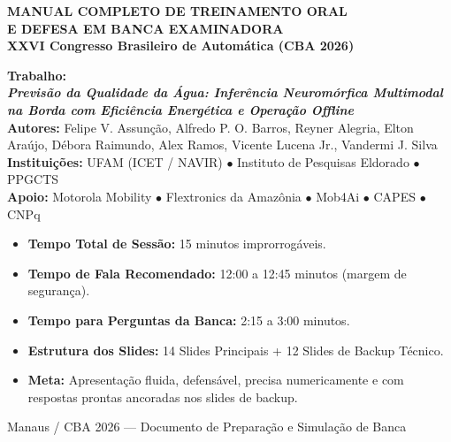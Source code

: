 \documentclass[11pt,a4paper]{article}
\begin{document}
\begin{titlepage}
\begin{center}
    \vspace*{0.5cm}
    {\Huge\color{CBAPurple}\bfseries MANUAL COMPLETO DE TREINAMENTO ORAL\\E DEFESA EM BANCA EXAMINADORA}\\[0.4cm]
    {\Large\color{CBAPetrol}\bfseries XXVI Congresso Brasileiro de Automática (CBA 2026)}\\[0.8cm]
    
    \begin{tcolorbox}[colback=CBALightPurple,colframe=CBAPurple,arc=4mm,width=0.95\linewidth]
        \centering\large
        \textbf{Trabalho:}\\[0.2cm]
        \textbf{\textit{Previsão da Qualidade da Água: Inferência Neuromórfica Multimodal na Borda com Eficiência Energética e Operação Offline}}\\[0.3cm]
        \normalsize
        \textbf{Autores:} Felipe V. Assunção, Alfredo P. O. Barros, Reyner Alegria, Elton Araújo, Débora Raimundo, Alex Ramos, Vicente Lucena Jr., Vandermi J. Silva\\
        \textbf{Instituições:} UFAM (ICET / NAVIR) $\bullet$ Instituto de Pesquisas Eldorado $\bullet$ PPGCTS\\
        \textbf{Apoio:} Motorola Mobility $\bullet$ Flextronics da Amazônia $\bullet$ Mob4Ai $\bullet$ CAPES $\bullet$ CNPq
    \end{tcolorbox}

    \vspace{0.8cm}

    \begin{minipage}{0.88\linewidth}
        \begin{tcolorbox}[colback=white,colframe=CBAGraphite,title=\textbf{Parâmetros Oficiais da Sessão Técnica},boxrule=0.8pt]
            \begin{itemize}[leftmargin=1.5em,itemsep=2pt]
                \item \textbf{Tempo Total de Sessão:} 15 minutos improrrogáveis.
                \item \textbf{Tempo de Fala Recomendado:} 12:00 a 12:45 minutos (margem de segurança).
                \item \textbf{Tempo para Perguntas da Banca:} 2:15 a 3:00 minutos.
                \item \textbf{Estrutura dos Slides:} 14 Slides Principais + 12 Slides de Backup Técnico.
                \item \textbf{Meta:} Apresentação fluida, defensável, precisa numericamente e com respostas prontas ancoradas nos slides de backup.
            \end{itemize}
        \end{tcolorbox}
    \end{minipage}

    \vfill
    {\small\color{CBAGraphite} Manaus / CBA 2026 --- Documento de Preparação e Simulação de Banca}
\end{center}
\end{titlepage}
\end{document}
